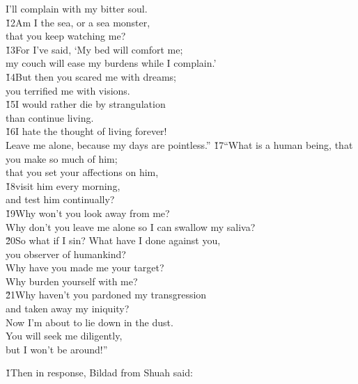 \begin{poetry}
\poemlll       I'll complain with my bitter soul. \\
\poeml \v{12}Am I the sea, or a sea monster, \\
\poemll    that you keep watching me? \\
\poeml \v{13}For I've said, `My bed will comfort me; \\
\poemll    my couch will ease my burdens while I complain.' \\
\poeml \v{14}But then you scared me with dreams; \\
\poemll    you terrified me with visions. \\
\poeml \v{15}I would rather die by strangulation \\
\poemll    than continue living. \\
\poeml \v{16}I hate the thought of living forever! \\
\poemll    Leave me alone, because my days are pointless.''
\poeml \v{17}``What is a human being, that you make so much of him; \\
\poemll    that you set your affections on him, \\
\poeml \v{18}visit him every morning, \\
\poemll    and test him continually? \\
\poeml \v{19}Why won't you look away from me? \\
\poemll    Why don't you leave me alone so I can swallow my saliva? \\
\poeml \v{20}So what if I sin? What have I done against you, \\
\poemll    you observer of humankind? \\
\poeml Why have you made me your target? \\
\poemll    Why burden yourself with me? \\
\poeml \v{21}Why haven't you pardoned my transgression \\
\poemll    and taken away my iniquity? \\
\poeml Now I'm about to lie down in the dust. \\
\poemll    You will seek me diligently, \\
\poemlll       but I won't be around!''
\end{poetry}

\v{1}Then in response, Bildad from Shuah said:

